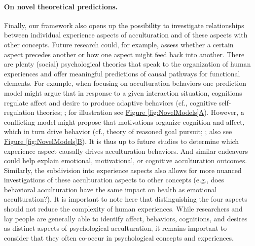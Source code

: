 \documentclass[man, 12pt, a4paper, mask]{apa7}
\newcommand{\fgrref}[2][]{\hyperref[#2]{Figure \ref*{#2}#1}}
\begin{document}
\paragraph{On novel theoretical predictions.} Finally, our framework also opens up the possibility to investigate relationships between individual experience aspects of acculturation and of these aspects with other concepts. Future research could, for example, assess whether a certain aspect precedes another or how one aspect might feed back into another. There are plenty (social) psychological theories that speak to the organization of human experiences and offer meaningful predictions of causal pathways for functional elements. For example, when focusing on acculturation behaviors one prediction model might argue that in response to a given interaction situation, cognitions regulate affect and desire to produce adaptive behaviors (cf., cognitive self-regulation theories; \citealp{Panadero2017}; for illustration see \fgrref[A]{fig:NovelModels}). However, a conflicting model might propose that motivations organize cognition and affect, which in turn drive behavior (cf., theory of reasoned goal pursuit; \citealp{Ajzen2019}; also see \fgrref[B]{fig:NovelModels}). It is thus up to future studies to determine which experience aspect causally drives acculturation behaviors. And similar endeavors could help explain emotional, motivational, or cognitive acculturation outcomes. Similarly, the subdivision into experience aspects also allows for more nuanced investigations of these acculturation aspects to other concepts (e.g., does behavioral acculturation have the same impact on health as emotional acculturation?). 
It is important to note here that distinguishing the four aspects should not reduce the complexity of human experiences. While researchers and lay people are generally able to identify affect, behaviors, cognitions, and desires as distinct aspects of psychological acculturation, it remains important to consider that they often co-occur in psychological concepts and experiences.
\end{document}
